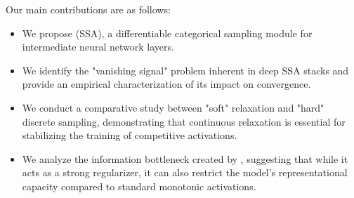 Our main contributions are as follows:
\begin{itemize}[leftmargin=*,itemsep=0pt,topsep=0pt]
    \item We propose \methodname (\textsc{SSA}), a differentiable categorical sampling module for intermediate neural network layers.
    \item We identify the "vanishing signal" problem inherent in deep \textsc{SSA} stacks and provide an empirical characterization of its impact on convergence.
    \item We conduct a comparative study between "soft" relaxation and "hard" discrete sampling, demonstrating that continuous relaxation is essential for stabilizing the training of competitive activations.
    \item We analyze the information bottleneck created by \methodname, suggesting that while it acts as a strong regularizer, it can also restrict the model's representational capacity compared to standard monotonic activations.
\end{itemize}
